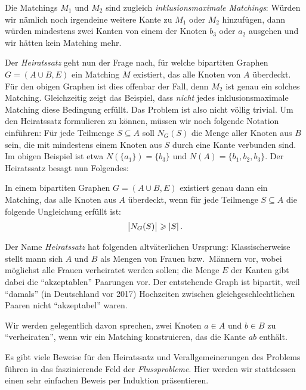 Die Matchings $M_1$ und $M_2$ sind zugleich \emph{inklusionsmaximale Matchings}: Würden wir nämlich noch irgendeine weitere Kante zu $M_1$ oder $M_2$ hinzufügen, dann würden mindestens zwei Kanten von einem der Knoten $b_3$ oder $a_2$ ausgehen und wir hätten kein Matching mehr.

Der \emph{Heiratssatz}
geht nun der Frage nach, für welche bipartiten Graphen $G=(A\cup B,E)$ ein Matching $M$ existiert, das alle Knoten von $A$ überdeckt. Für den obigen Graphen ist dies offenbar der Fall, denn $M_2$ ist genau ein solches Matching. Gleichzeitig zeigt das Beispiel, dass \emph{nicht} jedes inklusionsmaximale Matching diese Bedingung erfüllt. Das Problem ist also nicht völlig trivial. Um den Heiratssatz formulieren zu können, müssen wir noch folgende Notation einführen: Für jede Teilmenge $S\subseteq A$ soll $N_G(S)$ die Menge aller Knoten aus $B$ sein, die mit mindestens einem Knoten aus $S$ durch eine Kante verbunden sind. Im obigen Beispiel ist etwa $N(\{a_1\})=\{b_3\}$ und $N(A)=\{b_1,b_2,b_3\}$. Der Heiratssatz besagt nun Folgendes:
\begin{satzmitnamen}[Heiratssatz]
	In einem bipartiten Graphen $G=(A\cup B,E)$ existiert genau dann ein Matching, das alle Knoten aus $A$ überdeckt, wenn für jede Teilmenge $S\subseteq A$ die folgende Ungleichung erfüllt ist:
	\begin{equation*}
		\abs[\big]{N_G(S)}\geqslant \abs{S}\,.
	\end{equation*}
\end{satzmitnamen}
Der Name \emph{Heiratssatz} hat folgenden altväterlichen Ursprung: Klassischerweise stellt mann sich $A$ und $B$ als Mengen von Frauen bzw.\ Männern vor, wobei möglichst alle Frauen verheiratet werden sollen; die Menge $E$ der Kanten gibt dabei die \enquote{akzeptablen} Paarungen vor. Der entstehende Graph ist bipartit, weil \enquote{damals} (in Deutschland vor 2017) Hochzeiten zwischen gleichgeschlechtlichen Paaren nicht \enquote{akzeptabel} waren.

Wir werden gelegentlich davon sprechen, zwei Knoten $a\in A$ und $b\in B$ zu \enquote{verheiraten}, wenn wir ein Matching konstruieren, das die Kante $ab$ enthält.

Es gibt viele Beweise für den Heiratssatz und Verallgemeinerungen des Problems führen in das faszinierende Feld der \emph{Flussprobleme}. Hier werden wir stattdessen einen sehr einfachen Beweis per Induktion präsentieren.

